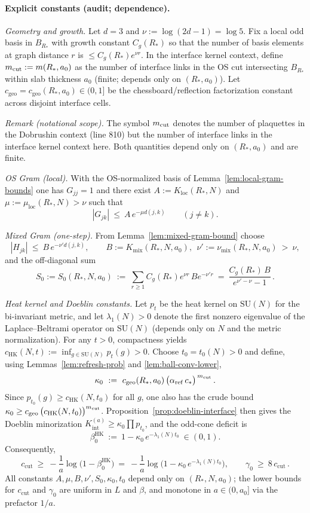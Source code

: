 \documentclass[11pt]{amsart}
\begin{document}
\paragraph{Explicit constants (audit; dependence).}
\emph{Geometry and growth.} Let $d=3$ and $\nu:=\log(2d-1)=\log 5$. Fix a local odd basis in $B_{R_*}$ with growth constant $C_g(R_*)$ so that the number of basis elements at graph distance $r$ is $\le C_g(R_*) e^{\nu r}$. In the interface kernel context, define $m_{\rm cut}:=m(R_*,a_0)$ as the number of interface links in the OS cut intersecting $B_{R_*}$ within slab thickness $a_0$ (finite; depends only on $(R_*,a_0)$). Let $c_{\mathrm{geo}}=c_{\mathrm{geo}}(R_*,a_0)\in(0,1]$ be the chessboard/reflection factorization constant across disjoint interface cells.

\emph{Remark (notational scope).} The symbol $m_{\rm cut}$ denotes the number of plaquettes in the Dobrushin context (line 810) but the number of interface links in the interface kernel context here. Both quantities depend only on $(R_*,a_0)$ and are finite.

\emph{OS Gram (local).} With the OS-normalized basis of Lemma~\ref{lem:local-gram-bounds} one has $G_{jj}=1$ and there exist $A:=K_{\mathrm{loc}}(R_*,N)$ and $\mu:=\mu_{\mathrm{loc}}(R_*,N)>\nu$ such that
\[
  |G_{jk}|\ \le\ A\,e^{-\mu d(j,k)}\qquad (j\ne k).
\]

\emph{Mixed Gram (one-step).} From Lemma~\ref{lem:mixed-gram-bound} choose
\[
  |H_{jk}|\ \le\ B\,e^{-\nu' d(j,k)},\qquad B:=K_{\mathrm{mix}}(R_*,N,a_0),\ \ \nu':=\nu_{\mathrm{mix}}(R_*,N,a_0)\ >\ \nu,
\]
and the off-diagonal sum
\[
  S_0:=S_0(R_*,N,a_0)\ :=\ \sum_{r\ge 1} C_g(R_*) e^{\nu r}\, B e^{-\nu' r}
   \ =\ \frac{C_g(R_*)\,B}{e^{\nu'-\nu}-1}\,.
\]

\emph{Heat kernel and Doeblin constants.} Let $p_t$ be the heat kernel on $\mathrm{SU}(N)$ for the bi-invariant metric, and let $\lambda_1(N)>0$ denote the first nonzero eigenvalue of the Laplace--Beltrami operator on $\mathrm{SU}(N)$ (depends only on $N$ and the metric normalization). For any $t>0$, compactness yields $c_{\mathrm{HK}}(N,t):=\inf_{g\in \mathrm{SU}(N)} p_t(g)>0$. Choose $t_0=t_0(N)>0$ and define, using Lemmas~\ref{lem:refresh-prob} and \ref{lem:ball-conv-lower},
\[
  \kappa_0\ :=\ c_{\mathrm{geo}}(R_*,a_0)\,\bigl(\alpha_{\mathrm{ref}}\,c_*\bigr)^{\,m_{\rm cut}}\,.
\]
Since $p_{t_0}(g)\ge c_{\mathrm{HK}}(N,t_0)$ for all $g$, one also has the crude bound $\kappa_0\ge c_{\mathrm{geo}}\,\bigl(c_{\mathrm{HK}}(N,t_0)\bigr)^{m_{\rm cut}}$. Proposition~\ref{prop:doeblin-interface} then gives the Doeblin minorization $K_{\mathrm{int}}^{(a)}\ge \kappa_0 \prod p_{t_0}$, and the odd-cone deficit is
\[
  \beta_0^{\mathrm{HK}}\ :=\ 1-\kappa_0\,e^{-\lambda_1(N) t_0}\ \in (0,1).
\]
Consequently,
\[
  c_{\mathrm{cut}}\ \ge\ -\frac{1}{a}\log\bigl(1-\beta_0^{\mathrm{HK}}\bigr)
   \ =\ -\frac{1}{a}\log\bigl(1-\kappa_0\,e^{-\lambda_1(N) t_0}\bigr),
  \qquad \gamma_0\ \ge\ 8\,c_{\mathrm{cut}}\,.
\]
All constants $A,\mu,B,\nu',S_0,\kappa_0,t_0$ depend only on $(R_*,N,a_0)$; the lower bounds for $c_{\mathrm{cut}}$ and $\gamma_0$ are uniform in $L$ and $\beta$, and monotone in $a\in(0,a_0]$ via the prefactor $1/a$.
\end{document}

